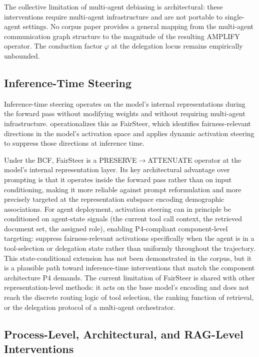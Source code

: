 \documentclass[acmsmall,nonacm]{acmart}
\begin{document}
The collective limitation of multi-agent debiasing is architectural: these interventions require multi-agent infrastructure and are not portable to single-agent settings. No corpus paper provides a general mapping from the multi-agent communication graph structure to the magnitude of the resulting AMPLIFY operator. The conduction factor $\varphi$ at the delegation locus remains empirically unbounded.

\subsection{Inference-Time Steering}

Inference-time steering operates on the model's internal representations during the forward pass without modifying weights and without requiring multi-agent infrastructure. \cite{li2025fairsteer} operationalizes this as FairSteer, which identifies fairness-relevant directions in the model's activation space and applies dynamic activation steering to suppress those directions at inference time.

Under the BCF, FairSteer is a PRESERVE$\rightarrow$ATTENUATE operator at the model's internal representation layer. Its key architectural advantage over prompting is that it operates inside the forward pass rather than on input conditioning, making it more reliable against prompt reformulation and more precisely targeted at the representation subspace encoding demographic associations. For agent deployment, activation steering can in principle be conditioned on agent-state signals (the current tool call context, the retrieved document set, the assigned role), enabling P4-compliant component-level targeting: suppress fairness-relevant activations specifically when the agent is in a tool-selection or delegation state rather than uniformly throughout the trajectory. This state-conditional extension has not been demonstrated in the corpus, but it is a plausible path toward inference-time interventions that match the component architecture P4 demands. The current limitation of FairSteer is shared with other representation-level methods: it acts on the base model's encoding and does not reach the discrete routing logic of tool selection, the ranking function of retrieval, or the delegation protocol of a multi-agent orchestrator.

\subsection{Process-Level, Architectural, and RAG-Level Interventions}
\end{document}
